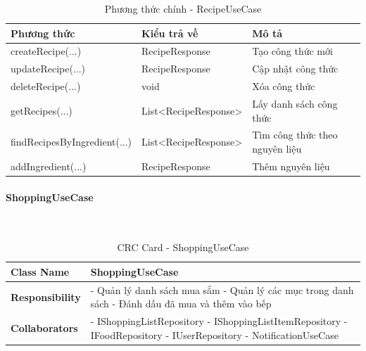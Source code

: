 \begin{table}[H]
\small
\renewcommand{\arraystretch}{1.3}
\begin{tabularx}{\textwidth}{|>{\raggedright\arraybackslash}p{5cm}|>{\raggedright\arraybackslash}p{3.5cm}|X|}
\hline
\rowcolor{gray!20}
\textbf{Phương thức} & \textbf{Kiểu trả về} & \textbf{Mô tả} \\
\hline
createRecipe(...) & RecipeResponse & Tạo công thức mới \\
\hline
updateRecipe(...) & RecipeResponse & Cập nhật công thức \\
\hline
deleteRecipe(...) & void & Xóa công thức \\
\hline
getRecipes(...) & List<RecipeResponse> & Lấy danh sách công thức \\
\hline
findRecipesByIngredient(...) & List<RecipeResponse> & Tìm công thức theo nguyên liệu \\
\hline
addIngredient(...) & RecipeResponse & Thêm nguyên liệu \\
\hline
\end{tabularx}
\caption{Phương thức chính - RecipeUseCase}
\end{table}

\paragraph{ShoppingUseCase} ~\\

\begin{table}[H]
\small
\renewcommand{\arraystretch}{1.3}
\begin{tabularx}{\textwidth}{|>{\raggedright\arraybackslash}p{3.5cm}|X|}
\hline
\rowcolor{gray!20}
\textbf{Class Name} & ShoppingUseCase \\
\hline
\textbf{Responsibility} & - Quản lý danh sách mua sắm \newline - Quản lý các mục trong danh sách \newline - Đánh dấu đã mua và thêm vào bếp \\
\hline
\textbf{Collaborators} & - IShoppingListRepository \newline - IShoppingListItemRepository \newline - IFoodRepository \newline - IUserRepository \newline - NotificationUseCase \\
\hline
\end{tabularx}
\caption{CRC Card - ShoppingUseCase}
\end{table}

